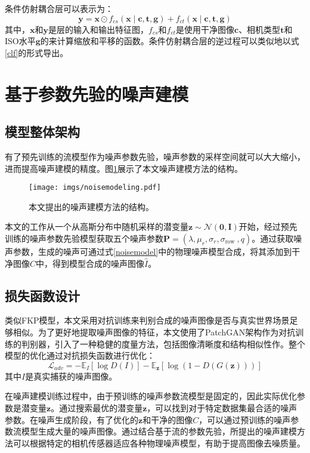 条件仿射耦合层可以表示为：
\begin{equation}
	\boldsymbol{y}=\boldsymbol{x} \odot f_{c s}(\boldsymbol{x} \mid \boldsymbol{c}, \boldsymbol{t}, \boldsymbol{g})+f_{c t}(\boldsymbol{x} \mid \boldsymbol{c}, \boldsymbol{t}, \boldsymbol{g})
\end{equation}
其中，$\boldsymbol{x}$和$\boldsymbol{y}$是层的输入和输出特征图，$f_{cs}$和$f_{ct}$是使用干净图像$\boldsymbol{c}$、相机类型$\boldsymbol{t}$和ISO水平$\boldsymbol{g}$的来计算缩放和平移的函数。条件仿射耦合层的逆过程可以类似地以式\ref{clf}的形式导出。



\section{基于参数先验的噪声建模}

\subsection{模型整体架构}

有了预先训练的流模型作为噪声参数先验，噪声参数的采样空间就可以大大缩小，进而提高噪声建模的精度。图\ref{fig:noisemodeling}展示了本文噪声建模方法的结构。

\begin{figure}[h]
	\centering
	\texttt{[image: imgs/noisemodeling.pdf]}
	\caption{本文提出的噪声建模方法的结构。}
	\label{fig:noisemodeling}
\end{figure}

本文的工作从一个从高斯分布中随机采样的潜变量$\boldsymbol{z} \sim \mathcal{N}(\mathbf{0}, \mathbf{I})$开始，经过预先训练的噪声参数先验模型获取五个噪声参数$\boldsymbol{P}=\left(\lambda, \mu_r, \sigma_r, \sigma_{\text {row }}, q\right)$。通过获取噪声参数，生成的噪声可通过式\ref{noisemodel}中的物理噪声模型合成，将其添加到干净图像$C$中，得到模型合成的噪声图像$\hat{I}$。

\subsection{损失函数设计}

类似FKP模型，本文采用对抗训练来判别合成的噪声图像是否与真实世界场景足够相似。为了更好地提取噪声图像的特征，本文使用了PatchGAN架构\cite{patchgan}作为对抗训练的判别器，引入了一种稳健的度量方法，包括图像清晰度和结构相似性作。整个模型的优化通过对抗损失函数进行优化：
\begin{equation}
	\mathcal{L}_{a d v}=-\mathbb{E}_I[\log D(I)]-\mathbb{E}_{\boldsymbol{z}}[\log (1-D(G(\boldsymbol{z})))]
\end{equation}
其中$I$是真实捕获的噪声图像。

在噪声建模训练过程中，由于预训练的噪声参数流模型是固定的，因此实际优化参数是潜变量$\boldsymbol{z}$。通过搜索最优的潜变量$\boldsymbol{z}$，可以找到对于特定数据集最合适的噪声参数。在噪声生成阶段，有了优化的$\boldsymbol{z}$和干净的图像$C$，可以通过预训练的噪声参数流模型生成大量的噪声图像。通过结合基于流的参数先验，所提出的噪声建模方法可以根据特定的相机传感器适应各种物理噪声模型，有助于提高图像去噪质量。


